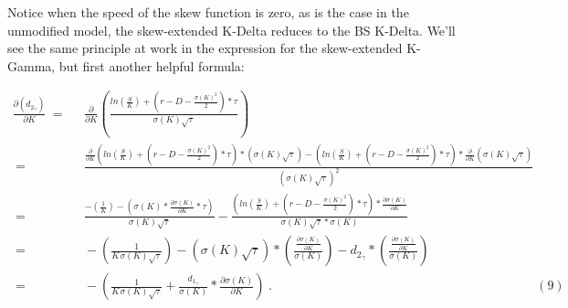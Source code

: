 \documentclass[12pt]{article}
\begin{document}
\vspace{-5pt}

\begin{paragraph}
\indent Notice when the speed of the skew function is zero, as is the case in the unmodified model, the skew-extended K-Delta reduces to the BS K-Delta. We'll see the same principle at work in the expression for the skew-extended K-Gamma, but first another helpful formula:
\end{paragraph}

{\footnotesize
\begin{align*}
\frac{\partial (d_{2_{\hspace{1pt} \gamma}})}{\partial K}   \hspace{3pt} =& \hspace{7pt}   \frac{\partial}{\partial K} (\frac{ln(\frac{S}{K})+(r-D-\frac{\sigma(K)^{2}}{2}) * \tau}{\sigma(K) \sqrt{\tau}})
\\[12pt]
\hspace{3pt} =& \hspace{7pt}   \frac{\frac{\partial}{\partial K} (ln(\frac{S}{K})+(r-D-\frac{\sigma(K)^{2}}{2}) * \tau) * (\sigma(K) \sqrt{\tau}) - (ln(\frac{S}{K})+(r-D-\frac{\sigma(K)^{2}}{2}) * \tau) * \frac{\partial}{\partial K} (\sigma(K) \sqrt{\tau})}{(\sigma(K) \sqrt{\tau})^{2}}
\\[12pt]
\hspace{3pt} =& \hspace{7pt}   \frac{-(\frac{1}{K}) - (\sigma(K) * \frac{\partial \sigma(K)}{\partial K} * \tau)}{\sigma(K) \sqrt{\tau}} - \frac{(ln(\frac{S}{K})+(r-D-\frac{\sigma(K)^{2}}{2}) * \tau) * \frac{\partial \sigma(K)}{\partial K}}{\sigma(K) \sqrt{\tau} * \sigma(K)}
\\[12pt]
\hspace{3pt} =& \hspace{7pt}   -(\frac{1}{K \hspace{1pt} \sigma(K) \sqrt{\tau}}) - (\sigma(K) \sqrt{\tau}) * (\frac{\frac{\partial \sigma(K)}{\partial K}}{\sigma(K)}) - d_{2_{\hspace{1pt} \gamma}} * (\frac{\frac{\partial \sigma(K)}{\partial K}}{\sigma(K)})
\\[12pt]
\hspace{3pt} =& \hspace{7pt}   -(\frac{1}{K \hspace{1pt} \sigma(K) \sqrt{\tau}} + \frac{d_{1_{\hspace{1pt} \gamma}}}{\sigma(K)} * \frac{\partial \sigma(K)}{\partial K}) \hspace{3pt}. \hspace{248pt} (9)
\end{align*}
}
\end{document}
